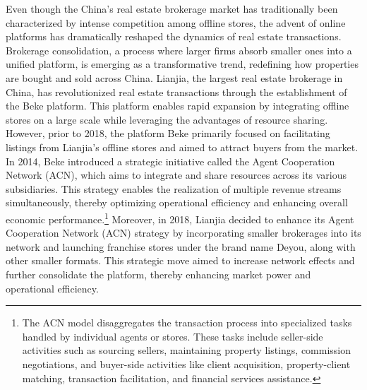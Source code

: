 \documentclass[11pt]{article}
\begin{document}
Even though the China's real estate brokerage market has traditionally been characterized by intense competition among offline stores, the advent of online platforms has dramatically reshaped the dynamics of real estate transactions. Brokerage consolidation, a process where larger firms absorb smaller ones into a unified platform, is emerging as a transformative trend, redefining how properties are bought and sold across China. Lianjia, the largest real estate brokerage in China, has revolutionized real estate transactions through the establishment of the Beke platform. This platform enables rapid expansion by integrating offline stores on a large scale while leveraging the advantages of resource sharing. However, prior to 2018, the platform Beke primarily focused on facilitating listings from Lianjia's offline stores and aimed to attract buyers from the market. In 2014, Beke introduced a strategic initiative called the Agent Cooperation Network (ACN), which aims to integrate and share resources across its various subsidiaries. This strategy enables the realization of multiple revenue streams simultaneously, thereby optimizing operational efficiency and enhancing overall economic performance.\footnote{The ACN model disaggregates the transaction process into specialized tasks handled by individual agents or stores. These tasks include seller-side activities such as sourcing sellers, maintaining property listings, commission negotiations, and buyer-side activities like client acquisition, property-client matching, transaction facilitation, and financial services assistance.} Moreover, in 2018, Lianjia decided to enhance its Agent Cooperation Network (ACN) strategy by incorporating smaller brokerages into its network and launching franchise stores under the brand name Deyou, along with other smaller formats. This strategic move aimed to increase network effects and further consolidate the platform, thereby enhancing market power and operational efficiency.
\end{document}
